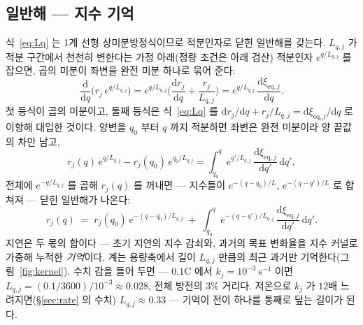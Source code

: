 \documentclass[11pt,a4paper]{article}
\newcommand{\dd}{\mathrm{d}}
\newcommand{\eq}{\mathrm{eq}}
\begin{document}
\subsection{일반해 — 지수 기억}
식~\eqref{eq:Lq} 는 1계 선형 상미분방정식이므로 적분인자로 닫힌 일반해를 갖는다. $L_{q,j}$ 가 적분
구간에서 천천히 변한다는 가정 아래(정량 조건은 아래 검산) 적분인자 $e^{q/L_{q,j}}$ 를 잡으면, 곱의
미분이 좌변을 완전 미분 하나로 묶어 준다:
\begin{equation}
\frac{\dd}{\dd q}\Big(r_j\,e^{q/L_{q,j}}\Big)
=e^{q/L_{q,j}}\Big(\frac{\dd r_j}{\dd q}+\frac{r_j}{L_{q,j}}\Big)
=e^{q/L_{q,j}}\,\frac{\dd\xi_{\eq,j}}{\dd q}.
\label{eq:intfactor}
\end{equation}
첫 등식이 곱의 미분이고, 둘째 등식은 식~\eqref{eq:Lq} 를 $\dd r_j/\dd q+r_j/L_{q,j}
=\dd\xi_{\eq,j}/\dd q$ 로 이항해 대입한 것이다. 양변을 $q_0$ 부터 $q$ 까지 적분하면 좌변은 완전
미분이라 양 끝값의 차만 남고,
\begin{equation}
r_j(q)\,e^{q/L_{q,j}}-r_j(q_0)\,e^{q_0/L_{q,j}}
=\int_{q_0}^{q}e^{q'/L_{q,j}}\,\frac{\dd\xi_{\eq,j}}{\dd q'}\,\dd q',
\label{eq:intfacint}
\end{equation}
전체에 $e^{-q/L_{q,j}}$ 를 곱해 $r_j(q)$ 를 꺼내면 — 지수들이 $e^{-(q-q_0)/L}$, $e^{-(q-q')/L}$ 로
합쳐져 — 닫힌 일반해가 나온다:
\begin{equation}
r_j(q)\;=\;r_j(q_0)\,e^{-(q-q_0)/L_{q,j}}
\;+\;\int_{q_0}^{q}e^{-(q-q')/L_{q,j}}\,\frac{\dd\xi_{\eq,j}}{\dd q'}\,\dd q'.
\label{eq:memory}
\end{equation}
지연은 두 몫의 합이다 — 초기 지연의 지수 감쇠와, 과거의 목표 변화율을 지수 커널로 가중해 누적한
\emph{기억}이다. 계는 용량축에서 길이 $L_{q,j}$ 만큼의 최근 과거만 기억한다(그림~\ref{fig:kernel}).
수치 감을 들어 두면 — $0.1$C 에서 $k_j=10^{-3}\ \mathrm{s^{-1}}$ 이면
$L_{q,j}=(0.1/3600)/10^{-3}\approx0.028$, 전체 방전의 $3\%$ 거리다. 저온으로 $k_j$ 가 $12$배
느려지면(\S\ref{sec:rate} 의 수치) $L_{q,j}\approx0.33$ — 기억이 전이 하나를 통째로 덮는 길이가 된다.
\end{document}
